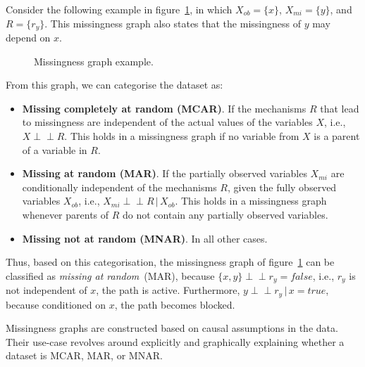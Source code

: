 \documentclass{article}
\newcommand{\giv}{\,|\,}
\newcommand{\indep}{\perp \!\!\! \perp}
\begin{document}
\noindent Consider the following example in figure~\ref{fig:missing_graph}, in which $X_{ob} = \{x\}$, $X_{mi} = \{y\}$, and $R = \{r_y\}$. This missingness graph also states that the missingness of $y$ may depend on $x$.  

\begin{figure}[H]
    \centering
    \caption{Missingness graph example. }
    \label{fig:missing_graph}
\end{figure}

\noindent From this graph, we can categorise the dataset as:
\begin{itemize}
    \item \textbf{Missing completely at random (MCAR)}. If the mechanisms $R$ that lead to missingness are independent of the actual values of the variables $X$, i.e., $X \indep R$. This holds in a missingness graph if no variable from $X$ is a parent of a variable in $R$. 
    \item \textbf{Missing at random (MAR)}. If the partially observed variables $X_{mi}$ are conditionally independent of the mechanisms $R$, given the fully observed variables $X_{ob}$, i.e., $X_{mi} \indep R \giv X_{ob}$. This holds in a missingness graph whenever parents of $R$ do not contain any partially observed variables. 
    \item \textbf{Missing not at random (MNAR)}. In all other cases. 
\end{itemize}

\noindent Thus, based on this categorisation, the missingness graph of figure~\ref{fig:missing_graph} can be classified as \textit{missing at random}~(MAR), because $\{x, y\} \indep r_y = false$, i.e., $r_y$ is not independent of $x$, the path is active. Furthermore, $y \indep r_y \giv x = true$, because conditioned on $x$, the path becomes blocked. 

Missingness graphs are constructed based on causal assumptions in the data. Their use-case revolves around explicitly and graphically explaining whether a dataset is MCAR, MAR, or MNAR. 
\end{document}

